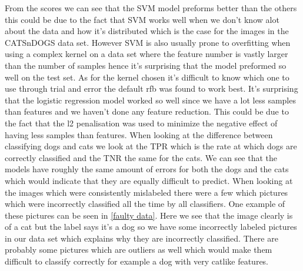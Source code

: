 \documentclass{article}
\begin{document}
From the scores we can see that the SVM model preforms better than the others this could be due to the fact that SVM works well when we don't know alot about the data and how it's distributed which is the case for the images in the CATSnDOGS data set. However SVM is also usually prone to overfitting when using a complex kernel on a data set where the feature number is vastly larger than the number of samples hence it's surprising that the model preformed so well on the test set. As for the kernel chosen it's difficult to know which one to use through trial and error the default rfb was found to work best. It's surprising that the logistic regression model worked so well since we have a lot less samples than features and we haven't done any feature reduction. This could be due to the fact that the l2 penalisation was used to minimize the negative effect of having less samples than features. When looking at the difference between classifying dogs and cats we look at the TPR which is the rate at which dogs are correctly classified and the TNR the same for the cats. We can see that the models have roughly the same amount of errors for both the dogs and the cats which would indicate that they are equally difficult to predict. When looking at the images which were consistently mislabeled there were a few which pictures which were incorrectly classified all the time by all classifiers. One example of these pictures can be seen in \ref{faulty data}. Here we see that the image clearly is of a cat but the label says it's a dog so we have some incorrectly labeled pictures in our data set which explains why they are incorrectly classified. There are probably some pictures which are outliers as well which would make them difficult to classify correctly for example a dog with very catlike features. 
\end{document}
